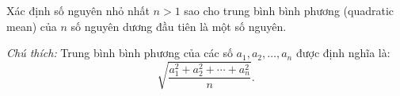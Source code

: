 \ifshowproblem
\begin{problem}\label{example:THA-2015-TSTST-Q-P1}
    Xác định số nguyên nhỏ nhất \( n > 1 \) sao cho trung bình bình phương (quadratic mean) của \( n \) số nguyên dương đầu tiên là một số nguyên.

    \textit{Chú thích:} Trung bình bình phương của các số \( a_1, a_2, \ldots, a_n \) được định nghĩa là:
    \[
        \sqrt{\frac{a_1^2 + a_2^2 + \cdots + a_n^2}{n}}.
    \]
\end{problem}
\fi

\footnotemark
{}
\fi